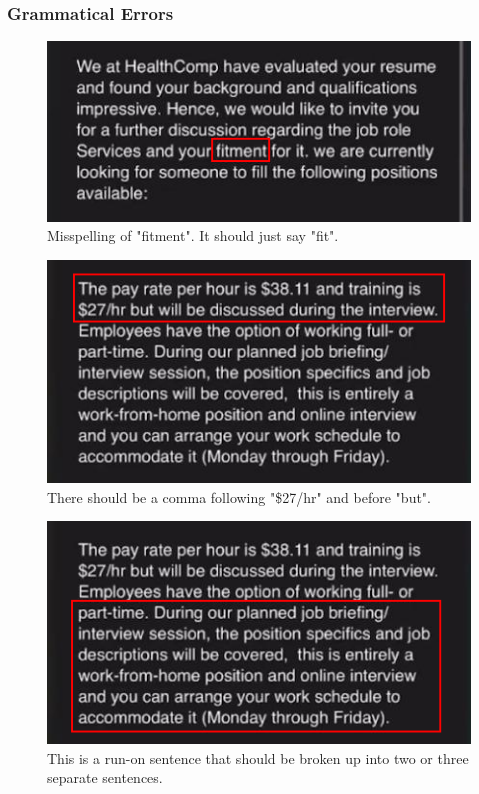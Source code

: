 \begin{fullwidth}
\subsubsection{Grammatical Errors}

\begin{figure}[H] %
    \label{sec:Fig2}
    \centering
    \includegraphics[width=.75\linewidth]{assets/misspelling.png}
    \captionsetup{justification=centering}
    \caption{Misspelling of "fitment". It should just say "fit".}
\end{figure}

\begin{figure}[H] %
    \label{sec:Fig3}
    \centering
    \includegraphics[width=.75\linewidth]{assets/missedCommas.png}
    \captionsetup{justification=centering}
    \caption{There should be a comma following "\$27/hr" and before "but".}
\end{figure}

\begin{figure}[H] %
    \label{sec:Fig4}
    \centering
    \includegraphics[width=.75\linewidth]{assets/runon.png}
    \captionsetup{justification=centering}
    \caption{This is a run-on sentence that should be broken up into two or three separate sentences.}
\end{figure}


\end{fullwidth}
